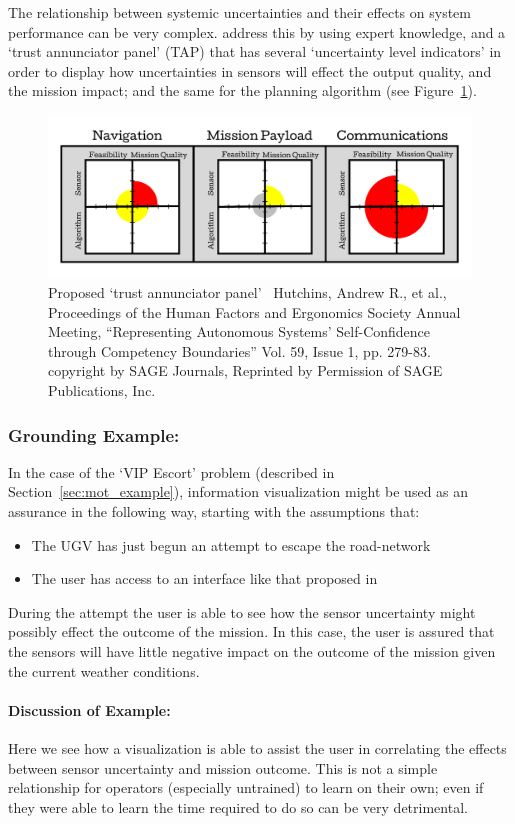The relationship between systemic uncertainties and their effects on system performance can be very complex. \citet{Hutchins2015-if} address this by using expert knowledge, and a `trust annunciator panel' (TAP) that has several `uncertainty level indicators' in order to display how uncertainties in sensors will effect the output quality, and the mission impact; and the same for the planning algorithm (see Figure~\ref{fig:hutchins_fig}).

\begin{figure}[htpb]
    \centering
    \includegraphics[width=0.6\linewidth]{Figures/Hutchins_fig.pdf}
    \caption{Proposed `trust annunciator panel'~\cite{Hutchins2015-if} Hutchins, Andrew R., et al., Proceedings of the Human Factors and Ergonomics Society Annual Meeting, ``Representing Autonomous Systems' Self-Confidence through Competency Boundaries'' Vol. 59, Issue 1, pp. 279-83. copyright  by SAGE Journals, Reprinted by Permission of SAGE Publications, Inc.}
    \label{fig:hutchins_fig}
    \vspace{-0.2 in}
\end{figure}

\subsubsection{Grounding Example:}
In the case of the `VIP Escort' problem (described in Section~\ref{sec:mot_example}), information visualization might be used as an assurance in the following way, starting with the assumptions that:

\begin{itemize}
    \item The UGV has just begun an attempt to escape the road-network
    \item The user has access to an interface like that proposed in \cite{Hutchins2015-if}
\end{itemize}

During the attempt the user is able to see how the sensor uncertainty might possibly effect the outcome of the mission. In this case, the user is assured that the sensors will have little negative impact on the outcome of the mission given the current weather conditions.

\paragraph{\textbf{Discussion of Example:}} Here we see how a visualization is able to assist the user in correlating the effects between sensor uncertainty and mission outcome. This is not a simple relationship for operators (especially untrained) to learn on their own; even if they were able to learn the time required to do so can be very detrimental.
